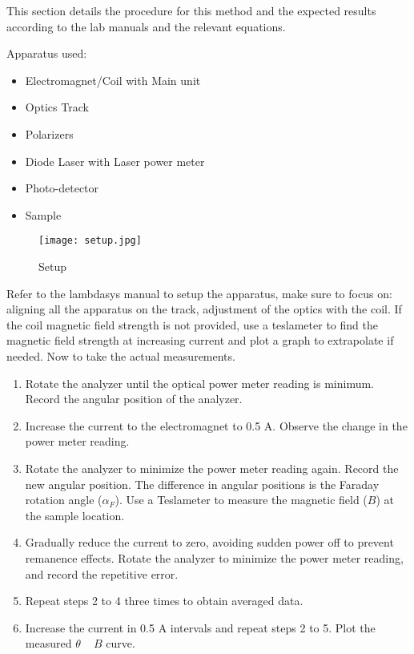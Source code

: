 \documentclass[11pt]{article}
\begin{document}
	This section details the procedure for this method and the expected results according to the lab manuals and the relevant equations.
	\par
	Apparatus used:
	\begin{itemize}
		\item Electromagnet/Coil with Main unit
		\item Optics Track
		\item Polarizers
		\item Diode Laser with Laser power meter
		\item Photo-detector
		\item Sample
	\end{itemize}
	\begin{figure}[!h]
		\centering
		\caption{Setup}
		\label{Apparatus}
		\texttt{[image: setup.jpg]}
	\end{figure}
	Refer to the lambdasys manual to setup the apparatus, make sure to focus on: aligning all the apparatus on the track, adjustment of the optics with the coil. If the coil magnetic field strength is not provided, use a teslameter to find the magnetic field strength at increasing current and plot a graph to extrapolate if needed. Now to take the actual measurements.
	\begin{enumerate}
		\item Rotate the analyzer until the optical power meter reading is minimum. Record the angular position of the analyzer.
		\item Increase the current to the electromagnet to 0.5 A. Observe the change in the power meter reading.
		\item Rotate the analyzer to minimize the power meter reading again. Record the new angular position. The difference in angular positions is the Faraday rotation angle ($\alpha_F$). Use a Teslameter to measure the magnetic field ($B$) at the sample location.
		\item Gradually reduce the current to zero, avoiding sudden power off to prevent remanence effects. Rotate the analyzer to minimize the power meter reading, and record the repetitive error.
		\item Repeat steps 2 to 4 three times to obtain averaged data.
		\item Increase the current in 0.5 A intervals and repeat steps 2 to 5. Plot the measured $\theta$ ~ $B$ curve.
	\end{enumerate}


\clearpage
\end{document}
